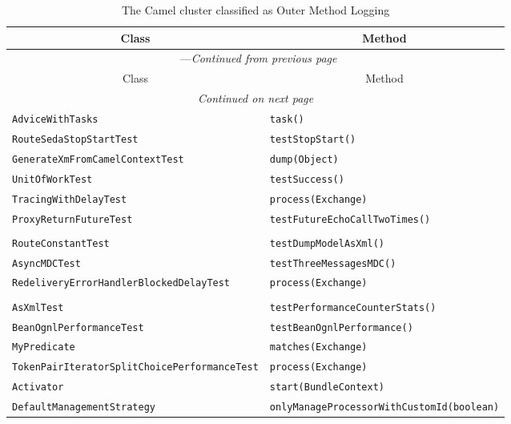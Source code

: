 \begin{center}
\begin{longtable}{ll}
\caption{The Camel cluster classified as Outer Method Logging}\\
\toprule\multicolumn{1}{c}{Class}&\multicolumn{1}{c}{Method}\\\midrule
\endfirsthead

\multicolumn{2}{c}{\tablename\ \thetable{}---\textit{Continued from previous page}} \\\midrule
\multicolumn{1}{c}{Class}&\multicolumn{1}{c}{Method}\\\midrule
\endhead
\multicolumn{2}{c}{\textit{Continued on next page}}\\\midrule
\endfoot
\bottomrule
\endlastfoot

\lstinline/AdviceWithTasks/&{\lstinline/task()/}\\
\lstinline/RouteSedaStopStartTest/&{\lstinline/testStopStart()/}\\
\lstinline/GenerateXmFromCamelContextTest/&{\lstinline/dump(Object)/}\\
\lstinline/UnitOfWorkTest/&{\lstinline/testSuccess()/}\\
\lstinline/TracingWithDelayTest/&{\lstinline/process(Exchange)/}\\
\lstinline/ProxyReturnFutureTest/&{\lstinline/testFutureEchoCallTwoTimes()/}\\
\raisebox{-13pt}{\shortstack{\lstinline/DumpModelAsXmlTransform/-\\\lstinline/RouteConstantTest/}}&{\lstinline/testDumpModelAsXml()/}\\
\lstinline/AsyncMDCTest/&{\lstinline/testThreeMessagesMDC()/}\\
\lstinline/RedeliveryErrorHandlerBlockedDelayTest/&{\lstinline/process(Exchange)/}\\
\raisebox{-13pt}{\shortstack{\lstinline/ManagedCamelContextDumpStats/-\\\lstinline/AsXmlTest/}}&{\lstinline/testPerformanceCounterStats()/}\\
\lstinline/BeanOgnlPerformanceTest/&{\lstinline/testBeanOgnlPerformance()/}\\
\lstinline/MyPredicate/&{\lstinline/matches(Exchange)/}\\
\lstinline/TokenPairIteratorSplitChoicePerformanceTest/&{\lstinline/process(Exchange)/}\\
\lstinline/Activator/&{\lstinline/start(BundleContext)/}\\
\lstinline/DefaultManagementStrategy/&{\lstinline/onlyManageProcessorWithCustomId(boolean)/}\\

\end{longtable}
\end{center}
